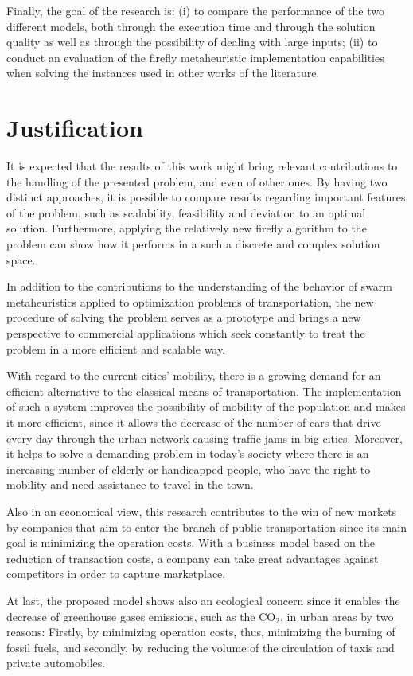 \documentclass[tuberlin,cic,tc,openright,english,noabntcite,oneside]{iiufrgs}
\begin{document}
Finally, the goal of the research is: (i) to compare the performance of the two different models, both through the execution time and through the solution quality as well as through the possibility of dealing with large inputs; (ii) to conduct an evaluation of the firefly metaheuristic implementation capabilities when solving the instances used in other works of the literature.

\section{Justification}
It is expected that the results of this work might bring relevant contributions to the handling of the presented problem, and even of other ones. By having two distinct approaches, it is possible to compare results regarding important features of the problem, such as scalability, feasibility and deviation to an optimal solution. Furthermore, applying the relatively new firefly algorithm to the problem can show how it performs in a such a discrete and complex solution space.

In addition to the contributions to the understanding of the behavior of swarm metaheuristics applied to optimization problems of transportation, the new procedure of solving the problem serves as a prototype and brings a new perspective to commercial applications which seek constantly to treat the problem in a more efficient and scalable way.

With regard to the current cities' mobility, there is a growing demand for an efficient alternative to the classical means of transportation. The implementation of such a system improves the possibility of mobility of the population and makes it more efficient, since it allows the decrease of the number of cars that drive every day through the urban network causing traffic jams in big cities. Moreover, it helps to solve a demanding problem in today's society where there is an increasing number of elderly or handicapped people, who have the right to mobility and need assistance to travel in the town.

Also in an economical view, this research contributes to the win of new markets by companies that aim to enter the branch of public transportation since its main goal is minimizing the operation costs. With a business model based on the reduction of transaction costs, a company can take great advantages against competitors in order to capture marketplace.

At last, the proposed model shows also an ecological concern since it enables the decrease of greenhouse gases emissions, such as the CO$_{2}$, in urban areas by two reasons: Firstly, by minimizing operation costs, thus, minimizing the burning of fossil fuels, and secondly, by reducing the volume of the circulation of taxis and private automobiles.
\end{document}
